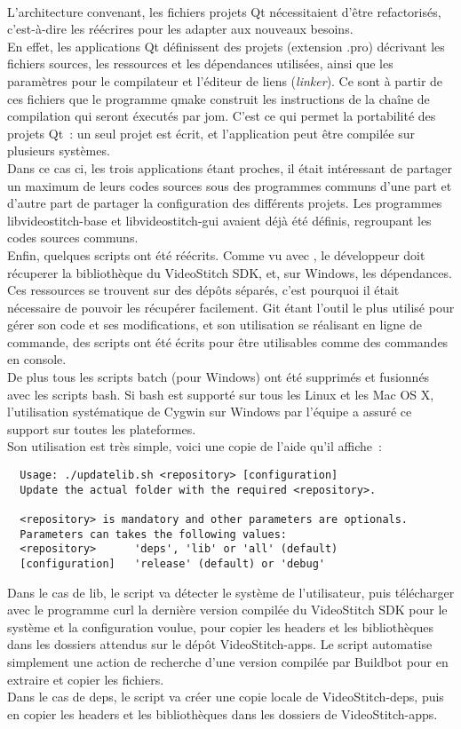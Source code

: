 \ \\
L'architecture convenant, les fichiers projets Qt nécessitaient d'être refactorisés,
c'est-à-dire les réécrires pour les adapter aux nouveaux besoins. \\
En effet, les applications Qt définissent des projets (extension .pro) décrivant
les fichiers sources, les ressources et les dépendances utilisées, ainsi que les
paramètres pour le compilateur et l'éditeur de liens (\textit{linker}). Ce sont à 
partir de ces fichiers que le programme qmake construit les instructions de la chaîne
de compilation qui seront éxecutés par jom\cite{qt}. C'est ce qui permet la portabilité
des projets Qt~: un seul projet est écrit, et l'application peut être compilée sur
plusieurs systèmes.\\
Dans ce cas ci, les trois applications étant proches, il était intéressant de partager un maximum de leurs
codes sources sous des programmes communs d'une part et d'autre part de partager
la configuration des différents projets. Les programmes libvideostitch-base et libvideostitch-gui
avaient déjà été définis, regroupant les codes sources communs. 
\ \\
\newline
Enfin, quelques scripts ont été réécrits. Comme vu avec , le
développeur doit récuperer la bibliothèque du VideoStitch SDK, et, sur Windows,
les dépendances. Ces ressources se trouvent sur des dépôts séparés, c'est pourquoi
il était nécessaire de pouvoir les récupérer facilement. Git étant l'outil le plus
utilisé pour gérer son code et ses modifications, et son utilisation se réalisant en ligne de commande,
des scripts ont été écrits pour être utilisables comme des commandes en console.\\
De plus tous les scripts batch (pour Windows) ont été supprimés et fusionnés avec
les scripts bash. Si bash est supporté sur tous les Linux et les Mac OS X,
l'utilisation systématique de Cygwin sur Windows par l'équipe a assuré ce support
sur toutes les plateformes.\\
Son utilisation est très simple, voici une copie de l'aide qu'il affiche~:
\begin{verbatim}
  Usage: ./updatelib.sh <repository> [configuration]
  Update the actual folder with the required <repository>.

  <repository> is mandatory and other parameters are optionals.
  Parameters can takes the following values:
  <repository>      'deps', 'lib' or 'all' (default)
  [configuration]   'release' (default) or 'debug'
\end{verbatim}
Dans le cas de lib, le script va détecter le système de l'utilisateur, puis télécharger avec le programme curl
la dernière version compilée du VideoStitch SDK pour le système et la configuration voulue, pour copier
les headers et les bibliothèques dans les dossiers attendus sur le dépôt VideoStitch-apps.
Le script automatise simplement une action de recherche d'une version compilée par Buildbot
pour en extraire et copier les fichiers.\\
Dans le cas de deps, le script va créer une copie locale de VideoStitch-deps, puis
en copier les headers et les bibliothèques dans les dossiers de VideoStitch-apps.

